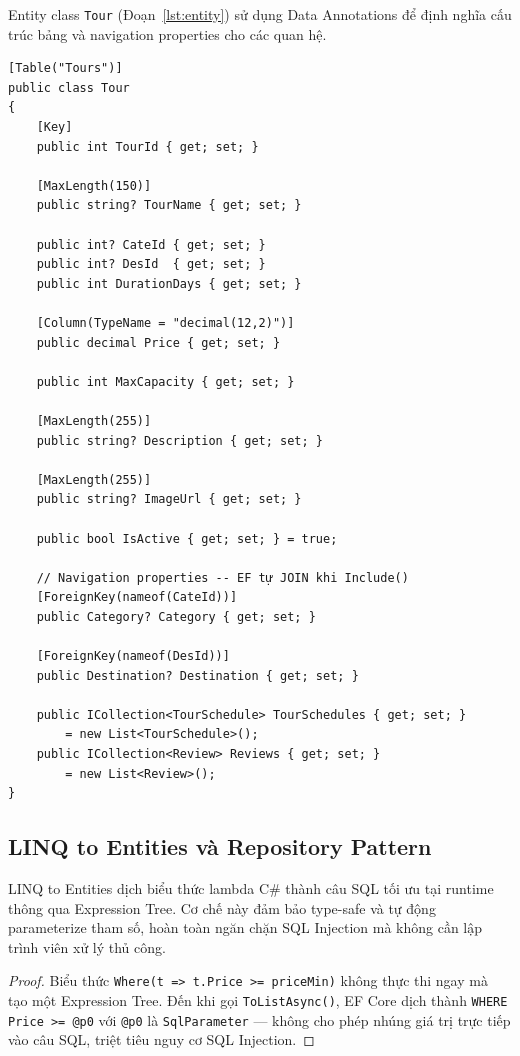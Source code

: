 Entity class \texttt{Tour} (Đoạn~\ref{lst:entity}) sử dụng
Data Annotations để định nghĩa cấu trúc bảng và navigation
properties cho các quan hệ.

\begin{lstlisting}[style=csharp,
  caption={Entity Tour với Data Annotations và navigation properties},
  label={lst:entity}]
[Table("Tours")]
public class Tour
{
    [Key]
    public int TourId { get; set; }

    [MaxLength(150)]
    public string? TourName { get; set; }

    public int? CateId { get; set; }
    public int? DesId  { get; set; }
    public int DurationDays { get; set; }

    [Column(TypeName = "decimal(12,2)")]
    public decimal Price { get; set; }

    public int MaxCapacity { get; set; }

    [MaxLength(255)]
    public string? Description { get; set; }

    [MaxLength(255)]
    public string? ImageUrl { get; set; }

    public bool IsActive { get; set; } = true;

    // Navigation properties -- EF tự JOIN khi Include()
    [ForeignKey(nameof(CateId))]
    public Category? Category { get; set; }

    [ForeignKey(nameof(DesId))]
    public Destination? Destination { get; set; }

    public ICollection<TourSchedule> TourSchedules { get; set; }
        = new List<TourSchedule>();
    public ICollection<Review> Reviews { get; set; }
        = new List<Review>();
}
\end{lstlisting}

\subsection{LINQ to Entities và Repository Pattern}
  \label{sub3.4.2}

\begin{thm}\label{thm3.3}
LINQ to Entities dịch biểu thức lambda C\# thành câu SQL tối
ưu tại runtime thông qua Expression Tree. Cơ chế này đảm bảo
type-safe và tự động parameterize tham số, hoàn toàn ngăn chặn
SQL Injection mà không cần lập trình viên xử lý thủ công.
\end{thm}

\noindent\begin{proof}
Biểu thức \texttt{Where(t => t.Price >= priceMin)} không thực
thi ngay mà tạo một Expression Tree. Đến khi gọi
\texttt{ToListAsync()}, EF Core dịch thành
\texttt{WHERE Price >= @p0} với \texttt{@p0} là
\texttt{SqlParameter} — không cho phép nhúng giá trị trực tiếp
vào câu SQL, triệt tiêu nguy cơ SQL Injection. \QEDAa
\end{proof}

